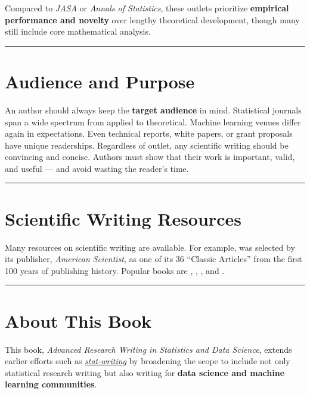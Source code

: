 \documentclass[
]{book}
\theoremstyle{definition}
\theoremstyle{definition}
\theoremstyle{definition}
\theoremstyle{definition}
\theoremstyle{remark}
\begin{document}
Compared to \emph{JASA} or \emph{Annals of Statistics}, these outlets prioritize \textbf{empirical performance and novelty} over lengthy theoretical development, though many still include core mathematical analysis.

\begin{center}\rule{0.5\linewidth}{0.5pt}\end{center}

\section{Audience and Purpose}\label{audience-and-purpose}

An author should always keep the \textbf{target audience} in mind. Statistical journals span a wide spectrum from applied to theoretical. Machine learning venues differ again in expectations. Even technical reports, white papers, or grant proposals have unique readerships. Regardless of outlet, any scientific writing should be convincing and concise. Authors must show that their work is important, valid, and useful --- and avoid wasting the reader's time.

\begin{center}\rule{0.5\linewidth}{0.5pt}\end{center}

\section{Scientific Writing Resources}\label{scientific-writing-resources}

Many resources on scientific writing are available. For example, \citet{gopen1990science} was selected by its publisher, \emph{American Scientist}, as one of its 36 ``Classic Articles'' from the first 100 years of publishing history. Popular books are \citet{oshima2000writing}, \citet{gopen2004expectations}, \citet{hairston2003successful}, and \citet{lebrun2021scientific}.

\begin{center}\rule{0.5\linewidth}{0.5pt}\end{center}

\section{About This Book}\label{about-this-book}

This book, \emph{Advanced Research Writing in Statistics and Data Science}, extends earlier efforts such as \href{https://statds.github.io/stat-writing/}{\emph{stat-writing}} by broadening the scope to include not only statistical research writing but also writing for \textbf{data science and machine learning communities}.
\end{document}
